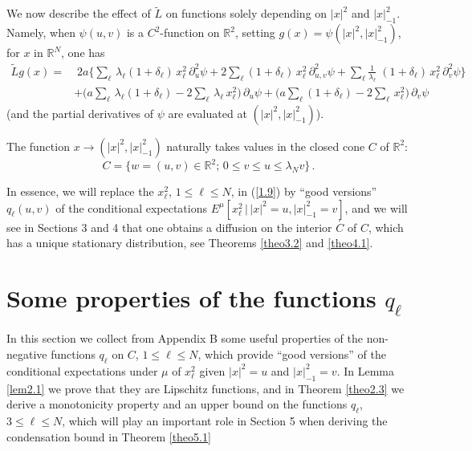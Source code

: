 \documentclass[12pt,leqno]{article}
\def\IR{{\mathbb R}}
\def\n{\noindent}
\def\dis{\displaystyle}
\def\wt{\widetilde}
\begin{document}
We now describe the effect of $\wt{L}$ on functions solely depending on $|x|^2$ and $|x|^2_{-1}$. Namely, when $\psi (u,v)$ is a $C^2$-function on $\IR^2$, setting $g(x) = \psi(|x|^2, |x|^2_{-1})$, for $x$ in $\IR^N$, one has
\begin{equation}\label{1.10}
\begin{split}
\wt{L} g(x) = & \; 2a \Big\{ \sum_\ell \, \lambda_\ell (1 + \delta_\ell) \,x^2_\ell \, \partial_u^2 \psi + 2 \sum_\ell (1 + \delta_\ell) \, x^2_\ell \, \partial^2_{u,v} \psi + \sum_\ell \dis\frac{1}{\lambda_\ell} \;(1 + \delta_\ell) \, x_\ell^2 \, \partial^2_v \psi\Big\}
\\
& + \Big(a \sum_\ell \,\lambda_\ell(1 + \delta_\ell) - 2 \sum_\ell \,\lambda_\ell \, x_\ell^2\Big) \, \partial_u \psi + \big(a \sum_\ell (1 + \delta_\ell) - 2 \sum_\ell \, x_\ell^2\Big) \, \partial_v \psi
\end{split}
\end{equation}
(and the partial derivatives of $\psi$ are evaluated at $(|x|^2, |x|^2_{-1})$).

\medskip
The function $x \longrightarrow (|x|^2, |x|^2_{-1})$ naturally takes values in the closed cone $C$ of $\IR^2$:
\begin{equation}\label{1.11}
C = \{ w = (u,v) \in \IR^2; \, 0 \le v \le u \le \lambda_N v\} \,.
\end{equation}

\n
In essence, we will replace the $x^2_\ell$, $1 \le \ell \le N$, in (\ref{1.9}) by ``good versions'' $q_\ell (u,v)$ of the conditional expectations $E^\mu[x^2_\ell \,\big| \, |x|^2 = u, |x|^2_{-1} = v]$, and we will see in Sections 3 and 4 that one obtains a diffusion on the interior $\stackrel{_\circ}{C}$ of $C$, which has a unique stationary distribution, see Theorems \ref{theo3.2} and \ref{theo4.1}.



\section{Some properties of the functions $q_\ell$}
\setcounter{equation}{0}

In this section we collect from Appendix B some useful properties of the non-negative functions $q_\ell$ on $C$, $1 \le \ell \le N$, which provide ``good versions'' of the conditional expectations under $\mu$ of $x^2_\ell$ given $|x|^2 = u$ and $|x|^2_{-1} = v$. In Lemma \ref{lem2.1} we prove that they are Lipschitz functions, and in Theorem \ref{theo2.3} we derive a monotonicity property and an upper bound on the functions $q_\ell$, $3 \le \ell \le N$, which will play an important role in Section 5 when deriving the condensation bound in Theorem \ref{theo5.1}
\end{document}
